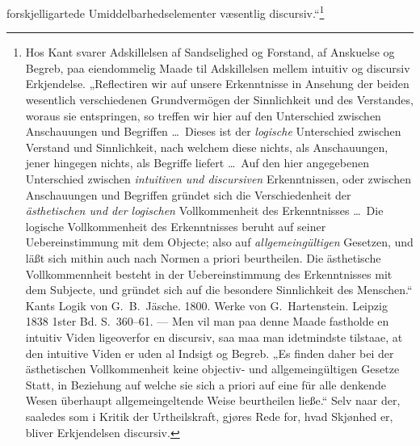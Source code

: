 \documentclass[12pt]{book}
\begin{document}
forskjelligartede Umiddelbarhedselementer væsentlig discursiv.“\footnote{Hos Kant svarer
Adskillelsen af Sandselighed og Forstand, af Anskuelse og Begreb, paa eiendommelig Maade til
Adskillelsen mellem intuitiv og discursiv Erkjendelse. „Reflectiren wir auf unsere Erkenntnisse in
Ansehung der beiden wesentlich verschiedenen Grundvermögen der Sinnlichkeit und des Verstandes,
woraus sie entspringen, so treffen wir hier auf den Unterschied zwischen Anschauungen und Begriffen
\dots\ Dieses ist der \emph{logische} Unterschied zwischen Verstand und Sinnlichkeit, nach welchem
diese nichts, als Anschauungen, jener hingegen nichts, als Begriffe liefert \dots\ Auf den hier
angegebenen Unterschied zwischen \emph{intuitiven und discursiven} Erkenntnissen, oder zwischen
Anschauungen und Begriffen gründet sich die Verschiedenheit der \emph{ästhetischen und der
logischen} Vollkommenheit des Erkenntnisses \dots\ Die logische Vollkommenheit des Erkenntnisses
beruht auf seiner Uebereinstimmung mit dem Objecte; also auf \emph{allgemeingültigen} Gesetzen, und
läßt sich mithin auch nach Normen a priori beurtheilen. Die ästhetische Vollkommennheit besteht in
der Uebereinstimmung des Erkenntnisses mit dem Subjecte, und gründet sich auf die besondere
Sinnlichkeit des Menschen.“ Kants Logik von G.~B.~Jäsche. 1800. Werke von G.~Hartenstein. Leipzig
1838 1ster Bd. S.~360--61. --- Men vil man paa denne Maade fastholde en intuitiv Viden ligeoverfor
en discursiv, saa maa man idetmindste tilstaae, at den intuitive Viden er uden al Indsigt og Begreb.
„Es finden daher bei der ästhetischen Vollkommenheit keine objectiv- und allgemeingültigen Gesetze
Statt, in Beziehung auf welche sie sich a priori auf eine für alle denkende Wesen überhaupt
allgemeingeltende Weise beurtheilen ließe.“ Selv naar der, saaledes som i Kritik der Urtheilskraft,
gjøres Rede for, hvad Skjønhed er, bliver Erkjendelsen discursiv.}
\end{document}

